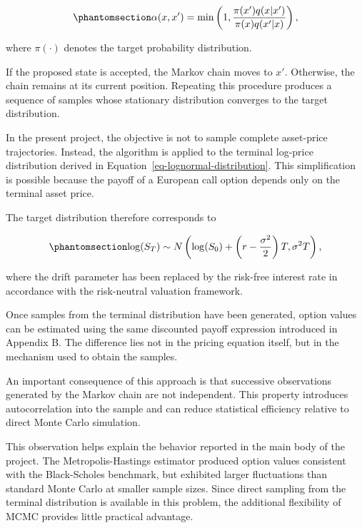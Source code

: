 \documentclass[
  12pt,
  letterpaper,
]{book}
\begin{document}
\begin{equation}\phantomsection\label{eq-mh-acceptance}{
\alpha(x,x')
=
\min
\left(
1,
\frac{\pi(x')q(x|x')}
{\pi(x)q(x'|x)}
\right),
}\end{equation}

where \(\pi(\cdot)\) denotes the target probability distribution.

If the proposed state is accepted, the Markov chain moves to \(x'\).
Otherwise, the chain remains at its current position. Repeating this
procedure produces a sequence of samples whose stationary distribution
converges to the target distribution.

In the present project, the objective is not to sample complete
asset-price trajectories. Instead, the algorithm is applied to the
terminal log-price distribution derived in
Equation~\ref{eq-lognormal-distribution}. This simplification is
possible because the payoff of a European call option depends only on
the terminal asset price.

The target distribution therefore corresponds to

\begin{equation}\phantomsection\label{eq-risk-neutral-lognormal}{
\log(S_T)
\sim
N
\left(
\log(S_0)
+
\left(
r-\frac{\sigma^2}{2}
\right)T,
\sigma^2T
\right),
}\end{equation}

where the drift parameter has been replaced by the risk-free interest
rate in accordance with the risk-neutral valuation framework.

Once samples from the terminal distribution have been generated, option
values can be estimated using the same discounted payoff expression
introduced in Appendix B. The difference lies not in the pricing
equation itself, but in the mechanism used to obtain the samples.

An important consequence of this approach is that successive
observations generated by the Markov chain are not independent. This
property introduces autocorrelation into the sample and can reduce
statistical efficiency relative to direct Monte Carlo simulation.

This observation helps explain the behavior reported in the main body of
the project. The Metropolis-Hastings estimator produced option values
consistent with the Black-Scholes benchmark, but exhibited larger
fluctuations than standard Monte Carlo at smaller sample sizes. Since
direct sampling from the terminal distribution is available in this
problem, the additional flexibility of MCMC provides little practical
advantage.
\end{document}
